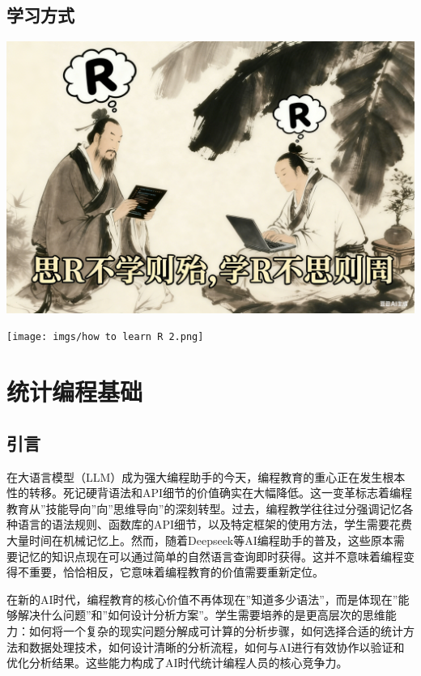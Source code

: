 \documentclass[
  twoside]{book}
\begin{document}
\hypertarget{ux5b66ux4e60ux65b9ux5f0f}{%
\section{学习方式}\label{ux5b66ux4e60ux65b9ux5f0f}}

\includegraphics{imgs/how to learn R.png}

\texttt{[image: imgs/how to learn R 2.png]}

\hypertarget{ux7edfux8ba1ux7f16ux7a0bux57faux7840}{%
\chapter{统计编程基础}\label{ux7edfux8ba1ux7f16ux7a0bux57faux7840}}

\hypertarget{ux5f15ux8a00}{%
\section{引言}\label{ux5f15ux8a00}}

在大语言模型（LLM）成为强大编程助手的今天，编程教育的重心正在发生根本性的转移。死记硬背语法和API细节的价值确实在大幅降低。这一变革标志着编程教育从''技能导向''向''思维导向''的深刻转型。过去，编程教学往往过分强调记忆各种语言的语法规则、函数库的API细节，以及特定框架的使用方法，学生需要花费大量时间在机械记忆上。然而，随着Deepseek等AI编程助手的普及，这些原本需要记忆的知识点现在可以通过简单的自然语言查询即时获得。这并不意味着编程变得不重要，恰恰相反，它意味着编程教育的价值需要重新定位。

在新的AI时代，编程教育的核心价值不再体现在''知道多少语法''，而是体现在''能够解决什么问题''和''如何设计分析方案''。学生需要培养的是更高层次的思维能力：如何将一个复杂的现实问题分解成可计算的分析步骤，如何选择合适的统计方法和数据处理技术，如何设计清晰的分析流程，如何与AI进行有效协作以验证和优化分析结果。这些能力构成了AI时代统计编程人员的核心竞争力。
\end{document}
